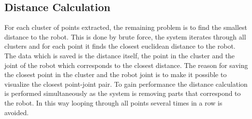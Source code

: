 \subsection{Distance Calculation}
For each cluster of points extracted, the remaining problem is to find the smallest distance to the  robot. This is done by brute force, the system iterates through all clusters and for each point it finds the closest euclidean distance to the robot. The data which is saved is the distance itself, the point in the cluster and the joint of the robot which corresponds to the closest distance. The reason for saving the closest point in the cluster and the robot joint is to make it possible to visualize the closest point-joint pair. To gain performance the distance calculation is performed simultaneously as the system is removing parts that correspond to the robot. In this way looping through all points several times in a row is avoided.